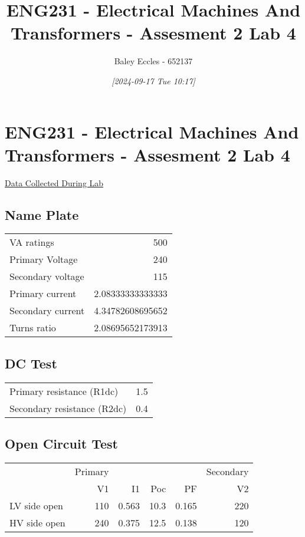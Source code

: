 \documentclass[11pt]{article}
\author{Baley Eccles - 652137}
\date{\textit{{[}2024-09-17 Tue 10:17]}}
\title{ENG231 - Electrical Machines And Transformers - Assesment 2 Lab 4}
\begin{document}
\maketitle
\tableofcontents

\section{ENG231 - Electrical Machines And Transformers - Assesment 2 Lab 4}
\label{sec:org70ff70e}
\href{file:///home/Baley/UTAS/ENG231 - Electrical Machines And Transformers/Lab 4/Data.ods}{Data Collected During Lab}
\subsection{Name Plate}
\label{sec:org1499395}
\begin{center}
\begin{tabular}{lr}
VA ratings & 500\\
Primary Voltage & 240\\
Secondary voltage & 115\\
Primary current & 2.08333333333333\\
Secondary current & 4.34782608695652\\
Turns ratio & 2.08695652173913\\
\end{tabular}
\end{center}
\subsection{DC Test}
\label{sec:org7c8fec9}
\begin{center}
\begin{tabular}{lr}
Primary resistance (R1dc) & 1.5\\
Secondary resistance (R2dc) & 0.4\\
\end{tabular}
\end{center}
\subsection{Open Circuit Test}
\label{sec:orgde0c8b9}
\begin{center}
\begin{tabular}{lrrrrr}
 & Primary &  &  &  & Secondary\\
 & V1 & I1 & Poc & PF & V2\\
LV side open & 110 & 0.563 & 10.3 & 0.165 & 220\\
HV side open & 240 & 0.375 & 12.5 & 0.138 & 120\\
\end{tabular}
\end{center}
\end{document}
